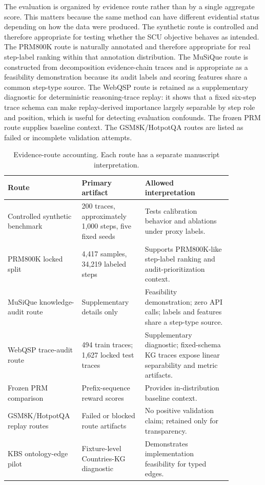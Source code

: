 \documentclass[a4paper,fleqn]{cas-sc}
\begin{document}
The evaluation is organized by evidence route rather than by a single aggregate score. This matters because the same method can have different evidential status depending on how the data were produced. The synthetic route is controlled and therefore appropriate for testing whether the SCU objective behaves as intended. The PRM800K route is naturally annotated and therefore appropriate for real step-label ranking within that annotation distribution. The MuSiQue route is constructed from decomposition evidence-chain traces and is appropriate as a feasibility demonstration because its audit labels and scoring features share a common step-type source. The WebQSP route is retained as a supplementary diagnostic for deterministic reasoning-trace replay: it shows that a fixed six-step trace schema can make replay-derived importance largely separable by step role and position, which is useful for detecting evaluation confounds. The frozen PRM route supplies baseline context. The GSM8K/HotpotQA routes are listed as failed or incomplete validation attempts.

\begin{table}[ht]
\caption{Evidence-route accounting. Each route has a separate manuscript interpretation.}
\label{tab:evidence-routes}
\centering
\small
\renewcommand{\arraystretch}{1.12}
\begin{tabular}{p{0.25\linewidth}p{0.26\linewidth}p{0.36\linewidth}}
\toprule
\textbf{Route} & \textbf{Primary artifact} & \textbf{Allowed interpretation} \\
\midrule
Controlled synthetic benchmark & 200 traces, approximately 1,000 steps, five fixed seeds & Tests calibration behavior and ablations under proxy labels. \\
PRM800K locked split & 4,417 samples, 34,219 labeled steps & Supports PRM800K-like step-label ranking and audit-prioritization context. \\
MuSiQue knowledge-audit route & Supplementary details only & Feasibility demonstration; zero API calls; labels and features share a step-type source. \\
WebQSP trace-audit route & 494 train traces; 1,627 locked test traces & Supplementary diagnostic; fixed-schema KG traces expose linear separability and metric artifacts. \\
Frozen PRM comparison & Prefix-sequence reward scores & Provides in-distribution baseline context. \\
GSM8K/HotpotQA replay routes & Failed or blocked route artifacts & No positive validation claim; retained only for transparency. \\
KBS ontology-edge pilot & Fixture-level Countries-KG diagnostic & Demonstrates implementation feasibility for typed edges. \\
\bottomrule
\end{tabular}
\end{table}
\end{document}
